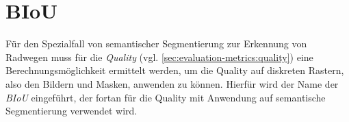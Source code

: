 
\section{\acf{BIoU}} \label{sec:eval:biou}

Für den Spezialfall von semantischer Segmentierung zur Erkennung von Radwegen muss für die \textit{Quality} (vgl. \autoref{sec:evaluation-metrics:quality}) 
eine Berechnungsmöglichkeit ermittelt werden, um die Quality auf diskreten Rastern, also den Bildern und Masken, anwenden zu können.
Hierfür wird der Name der \textit{\acf{BIoU}} eingeführt, der fortan für die Quality mit Anwendung auf semantische Segmentierung verwendet wird.

